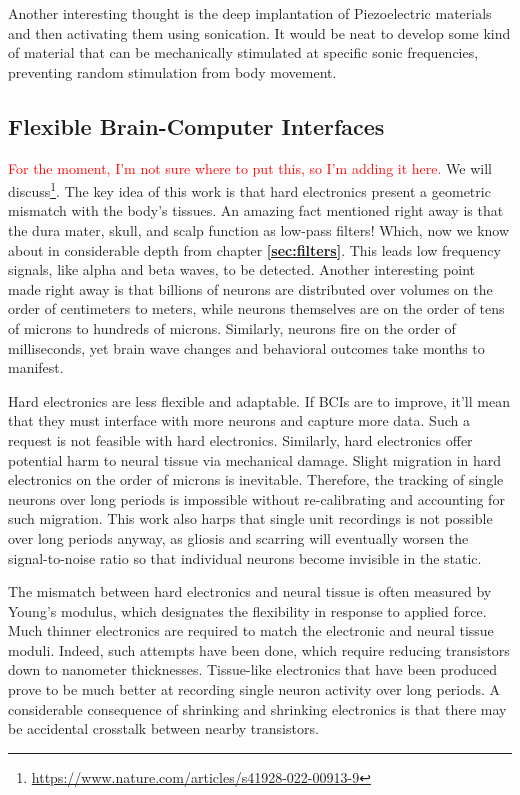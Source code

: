 Another interesting thought is the deep implantation of Piezoelectric materials and then activating them using sonication. It would be neat to develop some kind of material that can be mechanically stimulated at specific sonic frequencies, preventing random stimulation from body movement. 

\subsection{Flexible Brain-Computer Interfaces}

\textcolor{red}{For the moment, I'm not sure where to put this, so I'm adding it here.} We will discuss\footnote{\url{https://www.nature.com/articles/s41928-022-00913-9}}. The key idea of this work is that hard electronics present a geometric mismatch with the body's tissues. An amazing fact mentioned right away is that the dura mater, skull, and scalp function as low-pass filters! Which, now we know about in considerable depth from chapter \textbf{\ref{sec:filters}}. This leads low frequency signals, like alpha and beta waves, to be detected. Another interesting point made right away is that billions of neurons are distributed over volumes on the order of centimeters to meters, while neurons themselves are on the order of tens of microns to hundreds of microns. Similarly, neurons fire on the order of milliseconds, yet brain wave changes and behavioral outcomes take months to manifest.\newline

Hard electronics are less flexible and adaptable. If BCIs are to improve, it'll mean that they must interface with more neurons and capture more data. Such a request is not feasible with hard electronics. Similarly, hard electronics offer potential harm to neural tissue via mechanical damage. Slight migration in hard electronics on the order of microns is inevitable. Therefore, the tracking of single neurons over long periods is impossible without re-calibrating and accounting for such migration. This work also harps that single unit recordings is not possible over long periods anyway, as gliosis and scarring will eventually worsen the signal-to-noise ratio so that individual neurons become invisible in the static.\newline

The mismatch between hard electronics and neural tissue is often measured by Young's modulus, which designates the flexibility in response to applied force. Much thinner electronics are required to match the electronic and neural tissue moduli. Indeed, such attempts have been done, which require reducing transistors down to nanometer thicknesses. Tissue-like electronics that have been produced prove to be much better at recording single neuron activity over long periods. A considerable consequence of shrinking and shrinking electronics is that there may be accidental crosstalk between nearby transistors. \newline

